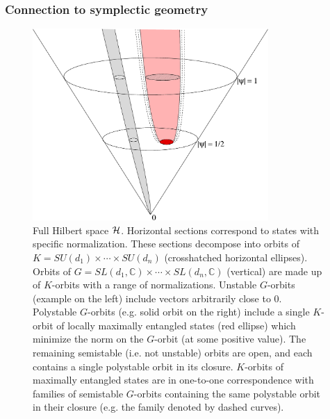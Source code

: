 \documentclass[12pt]{article}
\theoremstyle{definition}
\begin{document}
\subsubsection{Connection to symplectic geometry}


\begin{figure}
\centering
\includegraphics[width=0.8\textwidth]{cone.eps}
\caption{Full Hilbert space ${\cal H}$. Horizontal sections correspond to states with specific normalization. These sections decompose into orbits of $K = SU(d_1) \times \cdots \times SU(d_n)$ (crosshatched horizontal ellipses). Orbits of $G = SL(d_1, \mathbb{C}) \times \cdots \times SL(d_n,\mathbb{C})$ (vertical) are made up of $K$-orbits with a range of normalizations. Unstable $G$-orbits (example on the left) include vectors arbitrarily close to 0. Polystable $G$-orbits (e.g. solid orbit on the right) include a single $K$-orbit of locally maximally entangled states (red ellipse) which minimize the norm on the $G$-orbit (at some positive value). The remaining semistable (i.e. not unstable) orbits are open, and each contains a single polystable orbit in its closure. $K$-orbits of maximally entangled states are in one-to-one correspondence with families of semistable $G$-orbits containing the same polystable orbit in their closure (e.g. the family denoted by dashed curves).}
\label{fig:cone}
\end{figure}
\end{document}
